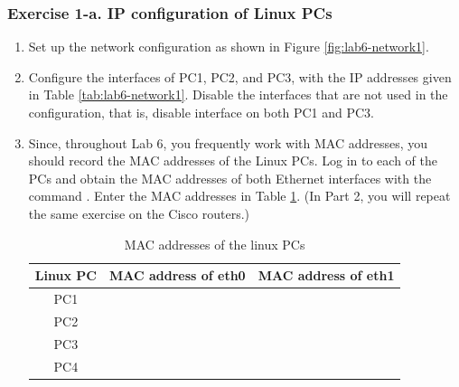 \subsubsection{Exercise 1-a. IP configuration of Linux PCs}
\begin{enumerate}
	\item Set up the network configuration as shown in Figure \ref{fig:lab6-network1}.
	\item Configure the interfaces of PC1, PC2, and PC3, with the IP addresses given in Table \ref{tab:lab6-network1}. Disable the interfaces that are not used in the configuration, that is, disable interface  on both PC1 and PC3.
	\item Since, throughout Lab 6, you frequently work with MAC addresses, you should record the MAC addresses of the Linux PCs. Log in to each of the PCs and obtain the MAC addresses of both Ethernet interfaces with the command . Enter the MAC addresses in Table \ref{tab:lab6-macs-pcs}. (In Part 2, you will repeat the same exercise on the Cisco routers.)
		\begin{table}[h!t]
			\centering
			\begin{tabular}{| c | c | c |}	
				\hline
				\textbf{Linux PC} & \textbf{MAC address of eth0} & \textbf{MAC address of eth1} \\ \hline
				PC1 &  &  \\ 
				PC2 &  &  \\
				PC3 &  &  \\
				PC4 &  &  \\ \hline
			\end{tabular}
			\caption{MAC addresses of the linux PCs}
			\label{tab:lab6-macs-pcs}
		\end{table}
\end{enumerate}

